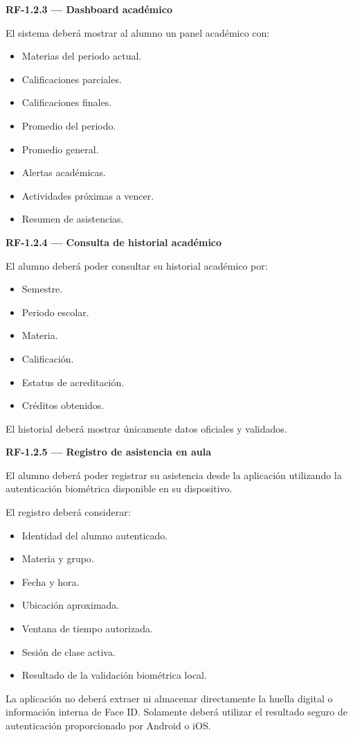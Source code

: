 \documentclass[12pt,a4paper]{article}
\newcommand{\RF}[1]{\textbf{\color{primary}RF-#1}}
\newenvironment{requisito}[1]
{
\begin{center}
\begin{minipage}{0.96\textwidth}
\colorbox{requirement}{
\begin{minipage}{0.94\textwidth}
\textbf{#1}
\end{minipage}
}
\vspace{2mm}
}
{
\end{minipage}
\end{center}
}
\begin{document}
\begin{requisito}{\RF{1.2.3} --- Dashboard académico}
El sistema deberá mostrar al alumno un panel académico con:

\begin{itemize}[leftmargin=*]
\item Materias del periodo actual.
\item Calificaciones parciales.
\item Calificaciones finales.
\item Promedio del periodo.
\item Promedio general.
\item Alertas académicas.
\item Actividades próximas a vencer.
\item Resumen de asistencias.
\end{itemize}
\end{requisito}

\begin{requisito}{\RF{1.2.4} --- Consulta de historial académico}
El alumno deberá poder consultar su historial académico por:

\begin{itemize}[leftmargin=*]
\item Semestre.
\item Periodo escolar.
\item Materia.
\item Calificación.
\item Estatus de acreditación.
\item Créditos obtenidos.
\end{itemize}

El historial deberá mostrar únicamente datos oficiales y validados.
\end{requisito}

\begin{requisito}{\RF{1.2.5} --- Registro de asistencia en aula}
El alumno deberá poder registrar su asistencia desde la aplicación utilizando
la autenticación biométrica disponible en su dispositivo.

El registro deberá considerar:

\begin{itemize}[leftmargin=*]
\item Identidad del alumno autenticado.
\item Materia y grupo.
\item Fecha y hora.
\item Ubicación aproximada.
\item Ventana de tiempo autorizada.
\item Sesión de clase activa.
\item Resultado de la validación biométrica local.
\end{itemize}

La aplicación no deberá extraer ni almacenar directamente la huella digital o
información interna de Face ID. Solamente deberá utilizar el resultado seguro de
autenticación proporcionado por Android o iOS.
\end{requisito}
\end{document}
